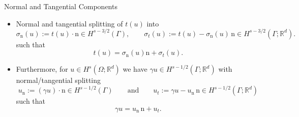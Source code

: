 \documentclass[10pt,aspectratio=169]{beamer}
\def\R{{\mathbb R}}
\begin{document}
\begin{frame}{Normal and Tangential Components}
	\begin{itemize}

		\item Normal and tangential splitting of $t(u)$ into
		      \begin{equation*}
			      \sigma_\mathrm{n}(u):=t(u)\cdot \mathrm{n}\in H^{s-3/2}(\Gamma),
			      \qquad
			      \sigma_t(u):=t(u)-\sigma_\mathrm{n}(u)\,\mathrm{n}\in H^{s-3/2}(\Gamma;\R^d).
		      \end{equation*}
		      such that
		      \begin{equation*}
			      t(u) = \sigma_\mathrm{n}(u)\mathrm{n} + \sigma_t(u).
		      \end{equation*}
		\item Furthermore, for $u\in H^{s}(\Omega;\R^d)$ we have $\gamma u\in H^{s-1/2}(\Gamma;\R^d)$ with normal/tangential splitting
		      \begin{equation*}
			      u_\mathrm{n}:= (\gamma u)\cdot \mathrm{n}\in H^{s-1/2}(\Gamma)\qquad\text{and}\qquad u_t:= \gamma u- u_\mathrm{n}\,\mathrm{n}\in H^{s-1/2}(\Gamma;\R^d)
		      \end{equation*}
		      such that
		      \begin{equation*}
			      \gamma u = u_\mathrm{n}\,\mathrm{n}+u_t.
		      \end{equation*}
	\end{itemize}
\end{frame}
\end{document}
